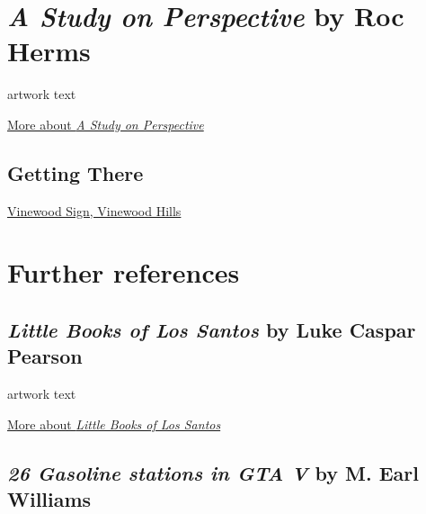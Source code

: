 \documentclass[
  openany]{book}
\begin{document}
\hypertarget{a-study-on-perspective-by-roc-herms}{%
\section*{\texorpdfstring{\emph{A Study on Perspective} by Roc Herms}{A Study on Perspective by Roc Herms}}\label{a-study-on-perspective-by-roc-herms}}

artwork text

\href{https://www.rocherms.com/projects/study-of-perspective/}{More about \emph{A Study on Perspective}}

\hypertarget{getting-there-4}{%
\subsection*{Getting There}\label{getting-there-4}}

\href{https://grandtheftdata.com/landmarks/\#1016.057,312.205,4,atlas,name=vinewood,Vinewood_Sign,_Vinewood_Hills}{Vinewood Sign, Vinewood Hills}

\hypertarget{further-references}{%
\section*{Further references}\label{further-references}}

\hypertarget{little-books-of-los-santos-by-luke-caspar-pearson}{%
\subsection*{\texorpdfstring{\emph{Little Books of Los Santos} by Luke Caspar Pearson}{Little Books of Los Santos by Luke Caspar Pearson}}\label{little-books-of-los-santos-by-luke-caspar-pearson}}

artwork text

\href{https://www.alephograph.com/little-books-of-los-santos}{More about \emph{Little Books of Los Santos}}

\hypertarget{gasoline-stations-in-gta-v-by-m.-earl-williams}{%
\subsection*{\texorpdfstring{\emph{26 Gasoline stations in GTA V} by M. Earl Williams}{26 Gasoline stations in GTA V by M. Earl Williams}}\label{gasoline-stations-in-gta-v-by-m.-earl-williams}}
\end{document}
